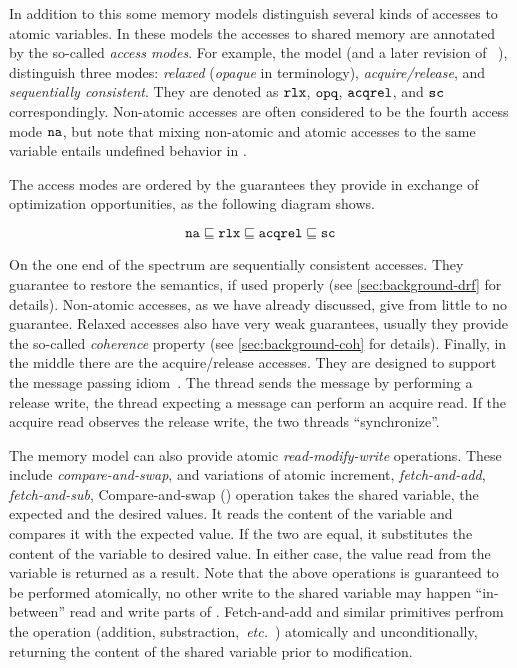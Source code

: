 In addition to this some memory models distinguish 
several kinds of accesses to atomic variables.
In these models the accesses to shared memory are annotated by the 
so-called \emph{access modes}.
For example, the \CPP model (and a later revision of 
\Java~\cite{Bender-Palsberg:OOPSLA19}), distinguish 
three modes: \emph{relaxed} (\emph{opaque} in \Java terminology), 
\emph{acquire/release}, and \emph{sequentially consistent}.
They are denoted as $\mathtt{rlx}$, $\mathtt{opq}$, ${\mathtt{acqrel}}$, and ${\mathtt{sc}}$ correspondingly.
Non-atomic accesses are often considered to be the fourth access mode $\mathtt{na}$, 
but note that mixing non-atomic and atomic accesses to the same variable 
entails undefined behavior in \CPP.

The access modes are ordered by the guarantees they provide
in exchange of optimization opportunities, as the following 
diagram shows.

$$ \mathtt{na} \sqsubseteq \mathtt{rlx} \sqsubseteq {\mathtt{acqrel}} \sqsubseteq {\mathtt{sc}} $$

On the one end of the spectrum are sequentially consistent accesses. 
They guarantee to restore the \SC semantics, if used properly 
(see \cref{sec:background-drf} for details).
Non-atomic accesses, as we have already discussed, give 
from little to no guarantee. 
Relaxed accesses also have very weak guarantees, 
usually they provide the so-called \emph{coherence} property
(see \cref{sec:background-coh} for details).
Finally, in the middle there are the acquire/release accesses. 
They are designed to support the message passing idiom~\cite{Lahav-al:POPL16}.
The thread sends the message by performing a release write, 
the thread expecting a message can perform an acquire read. 
If the acquire read observes the release write, the two 
threads ``synchronize''. 

The memory model can also provide atomic \emph{read-modify-write} operations.
These include \emph{compare-and-swap}, and variations of atomic increment,
\eg \emph{fetch-and-add}, \emph{fetch-and-sub}, \etc 
Compare-and-swap (\CAS) operation takes the shared variable, the expected 
and the desired values. It reads the content of the variable
and compares it with the expected value. If the two are equal,
it substitutes the content of the variable to desired value. 
In either case, the value read from the variable is returned as a result. 
Note that the above operations is guaranteed to be performed atomically, 
no other write to the shared variable may happen ``in-between'' 
read and write parts of \CAS.
Fetch-and-add and similar primitives perfrom 
the operation (addition, substraction,~\emph{etc.}~)
atomically and unconditionally, returning 
the content of the shared variable prior to modification.  

